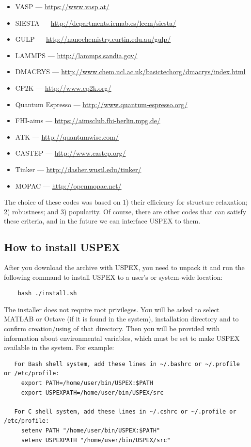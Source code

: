 \documentclass[12pt]{article}
\begin{document}
\begin{itemize}
\item VASP --- \url{https://www.vasp.at/}
\item SIESTA --- \url{http://departments.icmab.es/leem/siesta/}
\item GULP --- \url{http://nanochemistry.curtin.edu.au/gulp/}
\item LAMMPS --- \url{http://lammps.sandia.gov/}
\item DMACRYS --- \url{http://www.chem.ucl.ac.uk/basictechorg/dmacrys/index.html}
\item CP2K --- \url{http://www.cp2k.org/}
\item Quantum Espresso --- \url{http://www.quantum-espresso.org/}
\item FHI-aims --- \url{https://aimsclub.fhi-berlin.mpg.de/}
\item ATK --- \url{http://quantumwise.com/}
\item CASTEP --- \url{http://www.castep.org/}
\item Tinker --- \url{http://dasher.wustl.edu/tinker/}
\item MOPAC --- \url{http://openmopac.net/}
\end{itemize}

The choice of these codes was based on 1) their efficiency for structure
relaxation; 2) robustness; and 3) popularity. Of course, there are other codes
that can satisfy these criteria, and in the future we can interface USPEX to
them.

\subsection{How to install USPEX}
After you download the archive with USPEX, you need to unpack it and run the
following command to install USPEX to a user's or system-wide location:
\begin{verbatim}
    bash ./install.sh
\end{verbatim}

The installer does not require root privileges. You will be asked to select
MATLAB or Octave (if it is found in the system), installation directory and to
confirm creation/using of that directory. Then you will be provided with
information about environmental variables, which must be set to make USPEX
available in the system. For example:

{\footnotesize
\begin{verbatim}
   For Bash shell system, add these lines in ~/.bashrc or ~/.profile or /etc/profile:
     export PATH=/home/user/bin/USPEX:$PATH
     export USPEXPATH=/home/user/bin/USPEX/src

   For C shell system, add these lines in ~/.cshrc or ~/.profile or /etc/profile:
     setenv PATH "/home/user/bin/USPEX:$PATH"
     setenv USPEXPATH "/home/user/bin/USPEX/src"
\end{verbatim}
}
\end{document}
